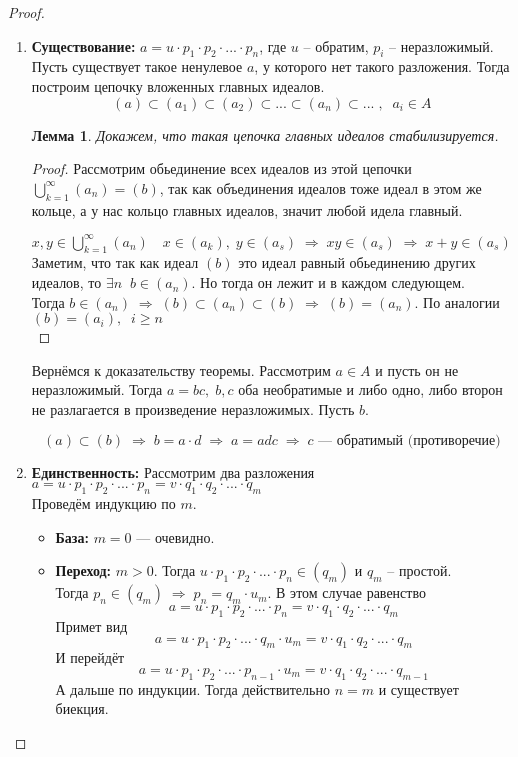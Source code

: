 \documentclass[12pt, a4paper]{article}
\newcommand{\ra}{\;\Rightarrow\;}
\newcommand{\bo}{\geqslant}
\theoremstyle{plain}
\newtheorem*{Lemma*}{Лемма}
\theoremstyle{definition}
\begin{document}
\begin{proof}~\
    \begin{enumerate}
        \item \textbf{Существование:} $ a = u\cdot p_1\cdot p_2\cdot...\cdot p_n$, где $u$ -- обратим, $p_i$ -- неразложимый.\\
              Пусть существует такое ненулевое $a$, у которого нет такого разложения. Тогда построим цепочку вложенных главных идеалов.
              \[(a)\subset(a_1)\subset(a_2)\subset...\subset(a_n)\subset...\;,\;\; a_i\in A\]
        \begin{Lemma*}
            Докажем, что такая цепочка главных идеалов стабилизируется.
        \end{Lemma*}
        \begin{proof}
            Рассмотрим обьединение всех идеалов из этой цепочки\\ $\bigcup\limits_{k=1}^{\infty}(a_n) = (b)$, так как объединения идеалов тоже идеал в этом же кольце, а у нас кольцо главных идеалов, значит любой идела главный.

            $x,y\in \bigcup\limits_{k=1}^{\infty}(a_n) \quad x\in (a_k),\; y\in (a_s)\ra xy\in(a_s)\ra x+y\in(a_s)$\\
            Заметим, что так как идеал $(b)$ это идеал равный обьединению других идеалов, то $\exists n\;\; b\in(a_n)$. Но тогда он лежит и в каждом следующем.
            \\ Тогда $b\in (a_n)\ra (b)\subset(a_n)\subset(b)\ra (b)=(a_n)$. По аналогии $(b) = (a_i),\;\; i\bo n$\\
        \end{proof}
        Вернёмся к доказательству теоремы. Рассмотрим $a\in A$ и пусть он не неразложимый. Тогда $a = bc,\; b,c$ оба необратимые и либо одно, либо второн не разлагается в произведение неразложимых. Пусть $b$.

        \[(a)\subset(b)\ra b = a\cdot d\ra a=adc\ra c\text{ --- обратимый (противоречие)}\]
        \item \textbf{Единственность:} Рассмотрим два разложения $a = u\cdot p_1\cdot p_2\cdot ...\cdot p_n = v\cdot q_1\cdot q_2\cdot ...\cdot q_m$\\
            Проведём индукцию по $m$.
            \begin{itemize}
                \item \textbf{База:} $m=0$ --- очевидно.
                \item \textbf{Переход:} $m>0$. Тогда $u\cdot p_1\cdot p_2\cdot ... \cdot p_n\in (q_m)$ и $q_m$ -- простой.\\ Тогда $p_n\in (q_m) \ra p_n = q_m\cdot u_m$. В этом случае равенство
                \[a = u\cdot p_1\cdot p_2\cdot ...\cdot p_n = v\cdot q_1\cdot q_2\cdot ...\cdot q_m\]
                Примет вид
                \[a = u\cdot p_1\cdot p_2\cdot ...\cdot q_m\cdot u_m = v\cdot q_1\cdot q_2\cdot ...\cdot q_m\]
                И перейдёт 
                \[a = u\cdot p_1\cdot p_2\cdot ...\cdot p_{n-1}\cdot u_m = v\cdot q_1\cdot q_2\cdot ...\cdot q_{m-1}\]
                А дальше по индукции. Тогда действительно $n=m$  и существует биекция.
            \end{itemize}
    \end{enumerate}
\end{proof}
\end{document}
